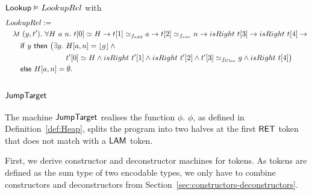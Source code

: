 \begin{lemma}
  \label{lem:Lookup_Realise}
  $\mathsf{Lookup} \mathrel{\vDash} LookupRel$
  with
  \small
  \begin{alignat*}{1}
    & LookupRel := \\
    &\quad \lambda t~(y, t').~\forall H~a~n.~ t[0] \simeq H \rightarrow t[1] \simeq_{f_{add}} a \rightarrow t[2] \simeq_{f_{var}} n \rightarrow isRight~t[3] \rightarrow isRight~t[4] \rightarrow \\
    &\quad\quad \MS{if}~y~\MS{then}~\bigl(\exists g.~H[a,n] = \Some{g} \land \\
    &\quad\quad \phantom{\MS{if}~y~\MS{then}~\bigl(\exists g.~} t'[0] \simeq H \land isRight~t'[1] \land isRight~t'[2] \land t'[3] \simeq_{f_{Clos}} g \land isRight~t[4]\bigr) \\
    &\quad\quad \MS{else}~ H[a,n] = \None.
\end{alignat*}
\end{lemma}


\subsection{$\mathsf{JumpTarget}$}
\label{sec:JumpTarget}


The machine $\mathsf{JumpTarget}$ realises the function $\phi$.  $\phi$, as defined in Definition~\ref{def:Heap}, splits the program into two halves at
the first $\mathsf{RET}$ token that does not match with a $\mathsf{LAM}$ token.

First, we derive constructor and deconstructor machines for tokens.  As tokens are defined as the sum type of two encodable types, we only have to
combine constructors and deconstructors from Section~\ref{sec:constructors-deconstructors}.






